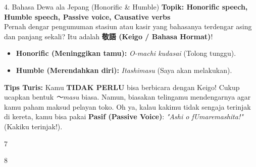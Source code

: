 \begin{lessonbox}{4. Bahasa Dewa ala Jepang (Honorific \& Humble)}
    \textbf{Topik: Honorific speech, Humble speech, Passive voice, Causative verbs} \\
    Pernah dengar pengumuman stasiun atau kasir yang bahasanya terdengar asing dan panjang sekali? Itu adalah \textbf{敬語 (Keigo / Bahasa Hormat)}!
    \begin{itemize}
        \item \textbf{Honorific (Meninggikan tamu):} \textit{O-machi kudasai} (Tolong tunggu).
        \item \textbf{Humble (Merendahkan diri):} \textit{Itashimasu} (Saya akan melakukan).
    \end{itemize}
    \textbf{Tips Turis:} Kamu \textbf{TIDAK PERLU} bisa berbicara dengan Keigo! Cukup ucapkan bentuk \textit{〜masu} biasa. Namun, biasakan telingamu mendengarnya agar kamu paham maksud pelayan toko. Oh ya, kalau kakimu tidak sengaja terinjak di kereta, kamu bisa pakai \textbf{Pasif (Passive Voice)}: \textit{"Ashi o fUmaremashita!"} (Kakiku terinjak!).
\end{lessonbox}

\begin{convobox}{7}
    \noindent
      

    \vspace{1.5em}
\end{convobox}

\begin{convobox}{8}
    \noindent
      
     

    \vspace{1.5em}
\end{convobox}

